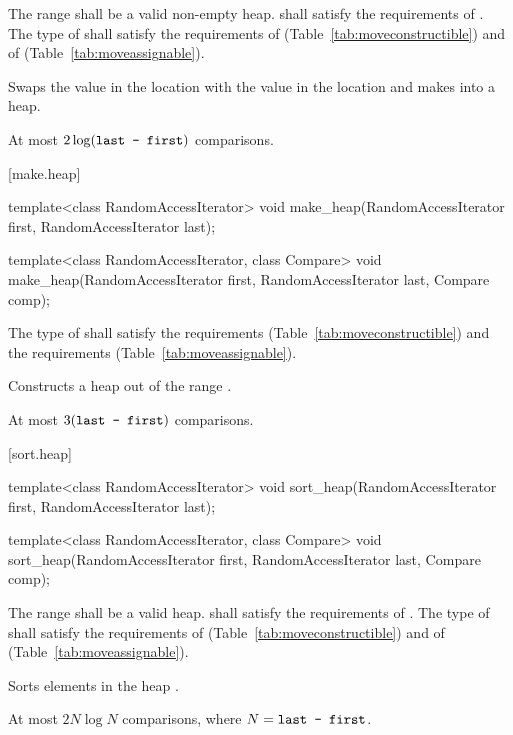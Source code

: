 \begin{itemdescr}
\pnum
\requires
The range
shall be a valid non-empty heap.
 shall satisfy the requirements of
. The type
of  shall satisfy the requirements of
 (Table~\ref{tab:moveconstructible}) and of
 (Table~\ref{tab:moveassignable}).


\pnum
\effects
Swaps the value in the location 
with the value in the location
and makes
into a heap.

\pnum
\complexity
At most
$2 \log(\texttt{last - first})$
comparisons.
\end{itemdescr}

[make.heap]{}

%
\begin{itemdecl}
template<class RandomAccessIterator>
  void make_heap(RandomAccessIterator first, RandomAccessIterator last);

template<class RandomAccessIterator, class Compare>
  void make_heap(RandomAccessIterator first, RandomAccessIterator last,
                 Compare comp);
\end{itemdecl}

\begin{itemdescr}
\pnum
\requires The type of  shall satisfy
the  requirements
(Table~\ref{tab:moveconstructible}) and the
 requirements
(Table~\ref{tab:moveassignable}).

\pnum
\effects
Constructs a heap out of the range
.

\pnum
\complexity
At most
$3(\texttt{last - first})$
comparisons.
\end{itemdescr}

[sort.heap]{}

%
\begin{itemdecl}
template<class RandomAccessIterator>
  void sort_heap(RandomAccessIterator first, RandomAccessIterator last);

template<class RandomAccessIterator, class Compare>
  void sort_heap(RandomAccessIterator first, RandomAccessIterator last,
                 Compare comp);
\end{itemdecl}

\begin{itemdescr}
\pnum
\requires The range  shall be a valid heap.
 shall satisfy the requirements of
. The type
of  shall satisfy the requirements of
 (Table~\ref{tab:moveconstructible}) and of
 (Table~\ref{tab:moveassignable}).

\pnum
\effects
Sorts elements in the heap
.

\pnum
\complexity
At most $2N \log N$
comparisons, where
$N = \texttt{last - first}$.
\end{itemdescr}


